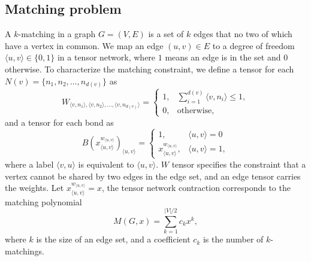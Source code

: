 \documentclass[onefignum, onetabnum]{siamart190516}
\newcommand{\<}{\langle}
\renewcommand{\>}{\rangle}
\begin{document}
\subsection{Matching problem}
A $k$-matching in a graph $G=(V,E)$ is a set of $k$ edges that no two of which have a vertex in common.
We map an edge $(u, v) \in E$ to a degree of freedom $\langle u, v\rangle \in \{0, 1\}$ in a tensor network, where $1$ means an edge is in the set and $0$ otherwise.
To characterize the matching constraint, we define a tensor for each $N(v)=\{n_1, n_2,\ldots, n_{d(v)}\}$ as
\begin{equation}
    W_{\langle v, n_1\rangle, \langle v, n_2 \rangle, \ldots, \langle v, n_{d(v)}\rangle} = \begin{cases}
        1, & \sum_{i=1}^{d(v)} \langle v, n_i \rangle \leq 1,\\
        0, & \text{otherwise},
    \end{cases}
\end{equation}
and a tensor for each bond as
\begin{equation}
    B(x^{w_{\langle u,v \rangle}}_{\langle u,v\rangle})_{\langle u, v\rangle} = \begin{cases}
    1, & \langle u, v \rangle = 0 \\
    x^{w_{\langle u,v \rangle}}_{\langle u, v\rangle}, & \langle u, v \rangle = 1,
\end{cases}
\end{equation}
where a label $\langle v, u \rangle$ is equivalent to $\langle u,v\rangle$.
$W$ tensor specifies the constraint that a vertex cannot be shared by two edges in the edge set,
and an edge tensor carries the weights.
Let $x_{\langle u,v\rangle}^{w_{\langle u,v\rangle}}=x$, the tensor network contraction corresponds to the matching polynomial
\begin{equation}
    M(G, x) = \sum\limits_{k=1}^{|V|/2} c_k x^k,
\end{equation}
where $k$ is the size of an edge set, and a coefficient $c_k$ is the number of $k$-matchings.
\end{document}
